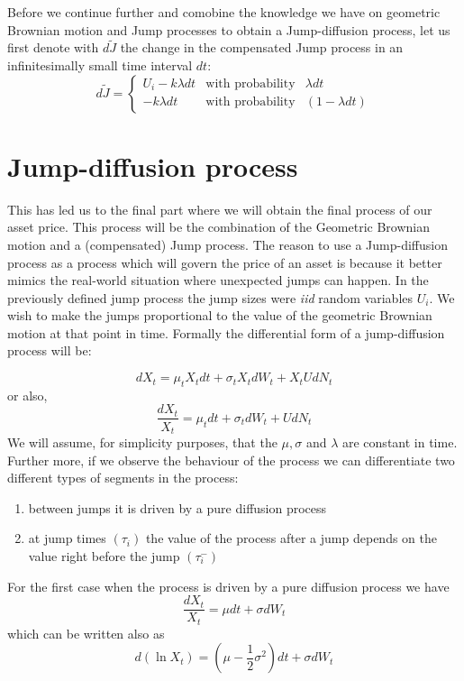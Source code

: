 \documentclass[times, utf8, diplomski]{fer}
\begin{document}
	Before we continue further and comobine the knowledge we have on geometric Brownian motion and Jump processes to obtain a Jump-diffusion process, let us first denote with $d\tilde{J}$ the change in the compensated Jump process in an infinitesimally small time interval $dt$:
	$$ d\tilde{J} = \left\{  \begin{array}{lcl} U_i - k\lambda dt& \mbox{with probability} & \lambda dt \\
																	- k\lambda dt & \mbox{with probability} & (1 - \lambda dt) \end{array} \right. $$
	\section{Jump-diffusion process}
	This has led us to the final part where we will obtain the final process of our asset price. This process will be the combination of the Geometric Brownian motion and a (compensated) Jump process. The reason to use a Jump-diffusion process as a process which will govern the price of an asset is because it better mimics the real-world situation where unexpected jumps can happen. In the previously defined jump process the jump sizes were \textit{iid} random variables $U_i$. We wish to make the jumps proportional to the value of the geometric Brownian motion at that point in time. Formally the differential form of a jump-diffusion process will be:

	\begin{equation} \label{eqn_jd}
		dX_t = \mu_tX_tdt + \sigma_tX_tdW_t + X_tUdN_t
	\end{equation} or also,
	\begin{equation} \label{eqn_jd_frac}
		\frac{dX_t}{X_t} = \mu_tdt + \sigma_tdW_t + UdN_t
	\end{equation} 
	We will assume, for simplicity purposes, that the $\mu, \sigma$ and $\lambda$ are constant in time. Further more, if we observe the behaviour of the process we can differentiate two different types of segments in the process:
	\begin{enumerate}
		\item between jumps it is driven by a pure diffusion process
		\item at jump times $(\tau_i)$ the value of the process after a jump depends on the value right before the jump $(\tau_i^-)$
	\end{enumerate}

	\noindent For the first case when the process is driven by a pure diffusion process we have
	\begin{equation}
		\frac{dX_t}{X_t} = \mu dt + \sigma dW_t
	\end{equation} which can be written also as 
	\begin{equation}
		d(\ln X_t) = (\mu - \frac{1}{2}\sigma^2)dt + \sigma dW_t
	\end{equation}
\end{document}
